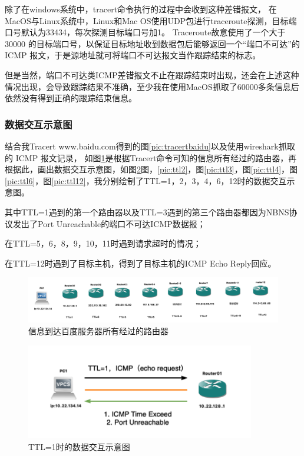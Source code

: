 \documentclass[a4paper,12pt]{report}
\begin{document}
\begin{spacing}{1.5}
除了在windows系统中，tracert命令执行的过程中会收到这种差错报文，
在MacOS与Linux系统中，Linux和Mac OS使用UDP包进行traceroute探测，目标端口号默认为33434，每次探测目标端口号加1。
Traceroute故意使用了一个大于 30000 的目标端口号，以保证目标地址收到数据包后能够返回一个“端口不可达”的 ICMP 报文，于是源地址就可将端口不可达报文当作跟踪结束的标志。

但是当然，端口不可达类ICMP差错报文不止在跟踪结束时出现，还会在上述这种情况出现，会导致跟踪结果不准确，至少我在使用MacOS抓取了60000多条信息后依然没有得到正确的跟踪结束信息。


\subsubsection{数据交互示意图}
结合我Tracert www.baidu.com得到的图\ref{pic:tracertbaidu}以及使用wireshark抓取的 ICMP 报文记录，
如图\ref{pic:allrouter}是根据Tracert命令可知的信息所有经过的路由器，再根据此，画出数据交互示意图，如图\ref{pic:ttl1}图，\ref{pic:ttl2}，图\ref{pic:ttl3}，图\ref{pic:ttl4}，图\ref{pic:ttl6}，图\ref{pic:ttl12}，我分别绘制了TTL=1，2，3，4，6，12时的数据交互示意图。

其中TTL=1遇到的第一个路由器以及TTL=3遇到的第三个路由器都因为NBNS协议发出了Port Unreachable的端口不可达ICMP数据报；

在TTL=5，6，8，9，10，11时遇到请求超时的情况；

在TTL=12时遇到了目标主机，得到了目标主机的ICMP Echo Reply回应。

\begin{figure}[htb!]
  \centering
\includegraphics[width=18cm]{figure/allrouter.png}
\caption{信息到达百度服务器所有经过的路由器}
\label{pic:allrouter}
\end{figure}


\begin{figure}[htb!]
  \centering
\includegraphics[width=10cm]{figure/ttl-1.png}
\caption{TTL=1时的数据交互示意图}
\label{pic:ttl1}
\end{figure}


\end{spacing}
\end{document}
